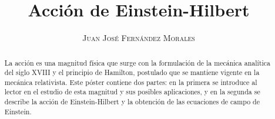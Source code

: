 \documentclass[a0,portrait]{a0poster} %
\title{\veryHuge Acción de Einstein-Hilbert} %
\author{\textsc{\huge Juan José Fernández Morales}} %
\date{} %
\begin{document}
\maketitle
\thispagestyle{empty}


\begin{abstract}\centering \fontsize{36}{40} \selectfont
    La acción es una magnitud física que surge con la formulación de la mecánica analítica del siglo XVIII y el principio de Hamilton, postulado que se mantiene vigente en la mecánica relativista. Este póster contiene dos partes: en la primera se introduce al lector en el estudio de esta magnitud y sus posibles aplicaciones, y en la segunda se describe la acción de Einstein-Hilbert y la obtención de las ecuaciones de campo de Einstein.
    
\end{abstract}

\vspace{25pt}\textbf{}
\end{document}
